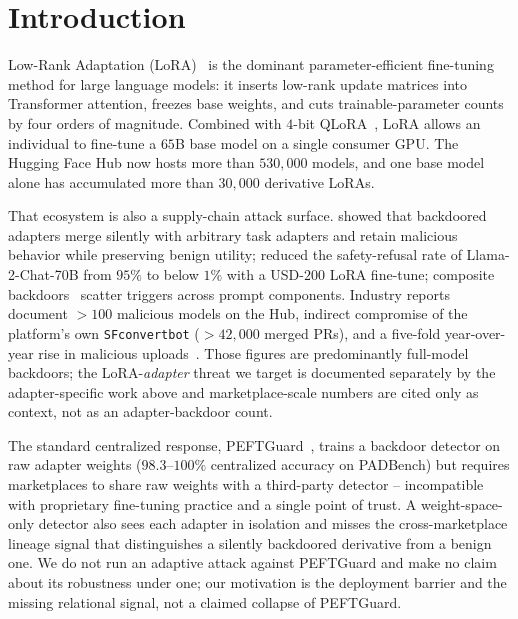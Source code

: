 \documentclass[11pt]{article}
\theoremstyle{plain}
\theoremstyle{definition}
\theoremstyle{remark}
\begin{document}
\section{Introduction}
\label{sec:intro}

Low-Rank Adaptation (LoRA)~\cite{hu2021lora} is the dominant
parameter-efficient fine-tuning method for large language models:
it inserts low-rank update matrices into Transformer attention,
freezes base weights, and cuts trainable-parameter counts by four
orders of magnitude. Combined with $4$-bit
QLoRA~\cite{dettmers2023qlora}, LoRA allows an individual to fine-tune
a $65$B base model on a single consumer GPU. The Hugging Face Hub
now hosts more than $530{,}000$ models, and one base model alone has
accumulated more than $30{,}000$ derivative LoRAs.

That ecosystem is also a supply-chain attack surface.
\citet{liu2024loraattack} showed that backdoored adapters merge
silently with arbitrary task adapters and retain malicious
behavior while preserving benign utility;
\citet{lermen2023lora} reduced the safety-refusal rate of
Llama-2-Chat-70B from $95\%$ to below $1\%$ with a USD-$200$
LoRA fine-tune; composite backdoors~\cite{huang2024composite}
scatter
triggers across prompt components. Industry reports document
${>}100$ malicious models on the Hub, indirect compromise of the
platform's own \texttt{SFconvertbot} (${>}42{,}000$ merged PRs),
and a five-fold year-over-year rise in malicious
uploads~\cite{cohen2024jfrog,kellas2025pickleball}. Those figures
are predominantly full-model backdoors; the LoRA-\emph{adapter}
threat we target is documented separately by the adapter-specific
work above and marketplace-scale numbers are cited only as
context, not as an adapter-backdoor count.

The standard centralized response, PEFTGuard~\cite{sun2025peftguard},
trains a backdoor detector on raw adapter weights ($98.3$--$100\%$
centralized accuracy on PADBench) but requires marketplaces to
share raw weights with a third-party detector -- incompatible
with proprietary fine-tuning practice and a single point of trust.
A weight-space-only detector also sees each adapter in isolation
and misses the cross-marketplace lineage signal that distinguishes
a silently backdoored derivative from a benign one. We do not run
an adaptive attack against PEFTGuard and make no claim about its
robustness under one; our motivation is the deployment barrier and
the missing relational signal, not a claimed collapse of PEFTGuard.
\end{document}
